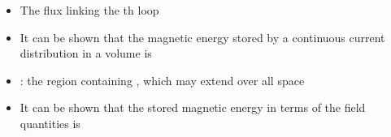 \begin{ELunit}

\begin{itemize}
\tightlist
\item
  The flux linking the th loop
\end{itemize}


\end{ELunit}

\begin{ELimportant}{}


\end{ELimportant}

\begin{ELjoin}

\begin{itemize}
\tightlist
\item
  It can be shown that the magnetic energy stored by a continuous current distribution in a volume is
\end{itemize}

\begin{ELimportant}{}


\end{ELimportant}

\end{ELjoin}

\begin{ELjoin}

\begin{itemize}
\tightlist
\item
  : the region containing , which may extend over all space
\item
  It can be shown that the stored magnetic energy in terms of the field quantities is
\end{itemize}

\begin{ELimportant}{}


\end{ELimportant}

\end{ELjoin}

